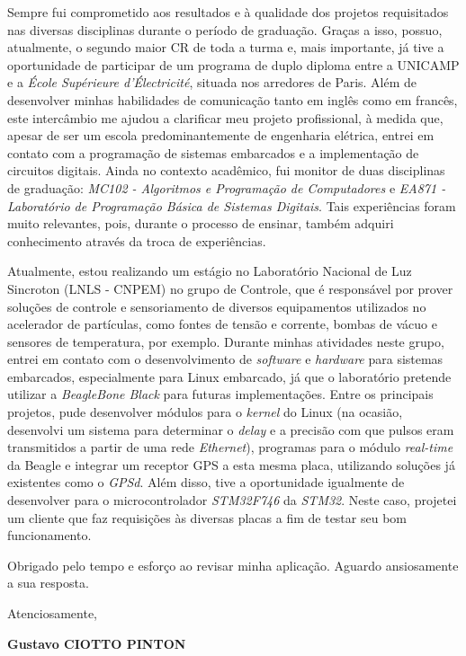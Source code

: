 \documentclass[12pt, a4paper]{article}
\begin{document}
\vspace{12pt}

Sempre fui comprometido aos resultados e à qualidade dos projetos requisitados
nas diversas disciplinas durante o período de graduação. Graças a isso, possuo,
atualmente, o segundo maior CR de toda a turma e, mais importante, já tive a
oportunidade de participar de um programa de duplo diploma entre a UNICAMP e a
\textit{École Supérieure d'Électricité}, situada nos arredores de Paris. Além de
desenvolver minhas habilidades de comunicação tanto em inglês como em francês,
este intercâmbio me ajudou a clarificar meu projeto profissional, à medida que,
apesar de ser um escola predominantemente de engenharia elétrica, entrei em contato com a
programação de sistemas embarcados e a implementação de circuitos digitais.
Ainda no contexto acadêmico, fui monitor de duas disciplinas de graduação:
\textit{MC102 - Algoritmos e Programação de Computadores} e \textit{EA871 -
Laboratório de Programação Básica de Sistemas Digitais}. Tais experiências foram
muito relevantes, pois, durante o processo de ensinar, também adquiri 
conhecimento através da troca de experiências.

\vspace{12pt}

Atualmente, estou realizando um estágio no Laboratório Nacional de Luz Sincroton
(LNLS - CNPEM) no grupo de Controle, que é responsável por prover soluções de
controle e sensoriamento de diversos equipamentos utilizados no acelerador de
partículas, como fontes de tensão e corrente, bombas de vácuo e sensores de
temperatura, por exemplo.  Durante minhas atividades neste grupo, entrei em
contato com o desenvolvimento de \textit{software} e \textit{hardware} para
sistemas embarcados, especialmente para Linux embarcado, já que o laboratório
pretende utilizar a \textit{BeagleBone Black} para futuras implementações. Entre
os principais projetos, pude desenvolver módulos para o \textit{kernel} do Linux
(na ocasião, desenvolvi um sistema para determinar o \textit{delay} e a precisão com
que pulsos eram transmitidos a partir de uma rede \textit{Ethernet}), programas
para o módulo \textit{real-time} da Beagle e integrar um receptor GPS a esta
mesma placa, utilizando soluções já existentes como o \textit{GPSd}. Além disso,
tive a oportunidade igualmente de desenvolver para o microcontrolador
\textit{STM32F746} da \textit{STM32}. Neste caso, projetei um cliente que faz
requisições às diversas placas a fim de testar seu bom funcionamento.

\vspace{12pt}

Obrigado pelo tempo e esforço ao revisar minha aplicação. Aguardo ansiosamente a sua resposta.

\vspace{12pt}

Atenciosamente,

\begin{flushright}
\textbf{Gustavo CIOTTO PINTON}
\end{flushright}
\end{document}
